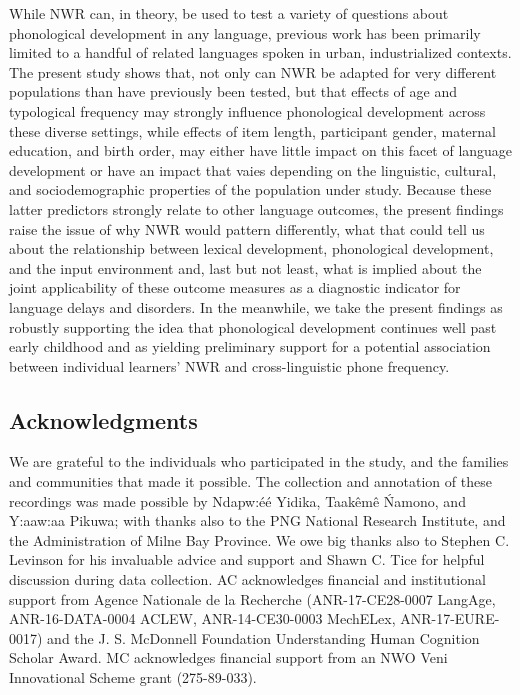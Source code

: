 \documentclass[english,,man,floatsintext]{apa6}
\begin{document}
While NWR can, in theory, be used to test a variety of questions about phonological development in any language, previous work has been primarily limited to a handful of related languages spoken in urban, industrialized contexts. The present study shows that, not only can NWR be adapted for very different populations than have previously been tested, but that effects of age and typological frequency may strongly influence phonological development across these diverse settings, while effects of item length, participant gender, maternal education, and birth order, may either have little impact on this facet of language development or have an impact that vaies depending on the linguistic, cultural, and sociodemographic properties of the population under study. Because these latter predictors strongly relate to other language outcomes, the present findings raise the issue of why NWR would pattern differently, what that could tell us about the relationship between lexical development, phonological development, and the input environment and, last but not least, what is implied about the joint applicability of these outcome measures as a diagnostic indicator for language delays and disorders. In the meanwhile, we take the present findings as robustly supporting the idea that phonological development continues well past early childhood and as yielding preliminary support for a potential association between individual learners' NWR and cross-linguistic phone frequency.

\newpage

\hypertarget{acknowledgments}{%
\subsection{Acknowledgments}\label{acknowledgments}}

We are grateful to the individuals who participated in the study, and the families and communities that made it possible. The collection and annotation of these recordings was made possible by Ndapw:éé Yidika, Taakêmê Ńamono, and Y:aaw:aa Pikuwa; with thanks also to the PNG National Research Institute, and the Administration of Milne Bay Province. We owe big thanks also to Stephen C. Levinson for his invaluable advice and support and Shawn C. Tice for helpful discussion during data collection. AC acknowledges financial and institutional support from Agence Nationale de la Recherche (ANR-17-CE28-0007 LangAge, ANR-16-DATA-0004 ACLEW, ANR-14-CE30-0003 MechELex, ANR-17-EURE-0017) and the J. S. McDonnell Foundation Understanding Human Cognition Scholar Award. MC acknowledges financial support from an NWO Veni Innovational Scheme grant (275-89-033).
\end{document}
